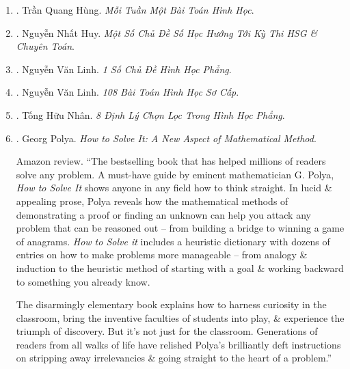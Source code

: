 \documentclass{article}
\begin{document}
\begin{enumerate}
	\item \cite{Hung_weekly_geometry}. {\sc Trần Quang Hùng}. {\it Mỗi Tuần Một Bài Toán Hình Học}.\hfill{\sf[reading]}
	
	\item \cite{Huy_so_hoc}. Nguyễn Nhất Huy. {\it Một Số Chủ Đề Số Học Hướng Tới Kỳ Thi HSG \& Chuyên Toán}.\hfill{\sf[reading]}
	
	\item \cite{Linh_topic_geometry}. Nguyễn Văn Linh. {\it 1 Số Chủ Đề Hình Học Phẳng}.\hfill{\sf[reading]}
	
	\item \cite{Linh_108_geometry}. Nguyễn Văn Linh. {\it 108 Bài Toán Hình Học Sơ Cấp}.\hfill{\sf[reading]}
	
	\item \cite{Nhan_8_geometry_theorem}. Tống Hữu Nhân. {\it 8 Định Lý Chọn Lọc Trong Hình Học Phẳng}.\hfill{\sf[reading]}
	
	\item \cite{Polya2014}. {\sc Georg Polya}. {\it How to Solve It: A New Aspect of Mathematical Method}. {}
	
	{\sf Amazon review.} ``The bestselling book that has helped millions of readers solve any problem. A must-have guide by eminent mathematician {\sc G. Polya}, {\it How to Solve It} shows anyone in any field how to think straight. In lucid \& appealing prose, {\sc Polya} reveals how the mathematical methods of demonstrating a proof or finding an unknown can help you attack any problem that can be reasoned out -- from building a bridge to winning a game of anagrams. {\it How to Solve it} includes a heuristic dictionary with dozens of entries on how to make problems more manageable -- from analogy \& induction to the heuristic method of starting with a goal \& working backward to something you already know.
	
	The disarmingly elementary book explains how to harness curiosity in the classroom, bring the inventive faculties of students into play, \& experience the triumph of discovery. But it's not just for the classroom. Generations of readers from all walks of life have relished {\sc Polya}'s brilliantly deft instructions on stripping away irrelevancies \& going straight to the heart of a problem.''
	

\end{enumerate}
\end{document}
